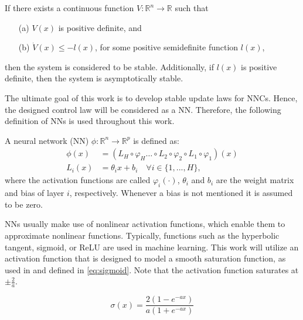 \begin{definition}
 If there exists a continuous function $V: \mathbb{R}^n \rightarrow \mathbb{R}$ such that
    \begin{enumerate}
     \item[(a)] $V(x)$ is positive definite, and
     \item[(b)] $\dot{V}(x)\leq-l(x)$, for some positive semidefinite function $l(x)$,
    \end{enumerate}
 then the system is considered to be stable. Additionally, if $l(x)$ is positive definite, then the system is asymptotically stable.
    \label{def:lyapunov-stability}
\end{definition}

The ultimate goal of this work is to develop stable update laws for NNCs. Hence, the designed control law will be considered as a NN. Therefore, the following definition of NNs is used throughout this work.

\begin{definition}
 A neural network (NN) $\phi:\mathbb{R}^n\rightarrow \mathbb{R}^p$ is defined as:
\begin{equation}
 \begin{aligned}
 \phi (x) & = (L_{H} \circ \varphi_{H} \dots \circ L_{2} \circ \varphi_{2} \circ L_{1} \circ \varphi_1)(x)\\
 L_i(x) &= \theta_i x + b_i \quad \forall i\in\{1,..., H\},
\end{aligned}
\end{equation}
 where the activation functions are called $\varphi_i(\cdot)$, $\theta_i$ and $b_i$ are the weight matrix and bias of layer $i$, respectively. Whenever a bias is not mentioned it is assumed to be zero.
\end{definition}

NNs usually make use of nonlinear activation functions, which enable them to approximate nonlinear functions. Typically, functions such as the hyperbolic tangent, sigmoid, or ReLU are used in machine learning. This work will utilize an activation function that is designed to model a smooth saturation function, as used in \cite{wahby_enhanced_2024, thanhNonlinearPIDControl2006} and defined in \eqref{eq:sigmoid}. Note that the activation function saturates at $\pm \frac{2}{a}$.

\begin{equation}
 \sigma (x) = \frac{2(1-e^{-ax})}{a(1+e^{-ax})}
 \label{eq:sigmoid}
\end{equation}


